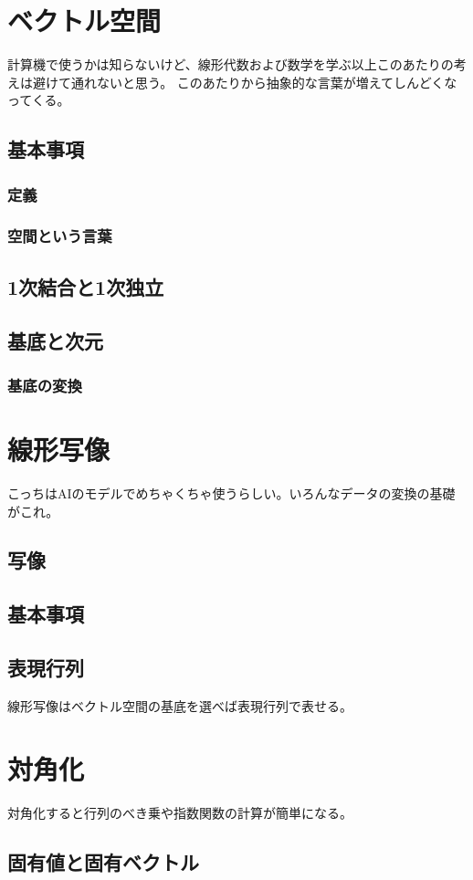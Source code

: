 \documentclass[10pt]{jsarticle}
\theoremstyle{definition}%
\numberwithin{equation}{section}%
\begin{document}
\section{ベクトル空間}
計算機で使うかは知らないけど、線形代数および数学を学ぶ以上このあたりの考えは避けて通れないと思う。
このあたりから抽象的な言葉が増えてしんどくなってくる。
\subsection{基本事項}
\subsubsection{定義}
\subsubsection{空間という言葉}
\subsection{1次結合と1次独立}
\subsection{基底と次元}
\subsubsection{基底の変換}
\section{線形写像}
こっちはAIのモデルでめちゃくちゃ使うらしい。いろんなデータの変換の基礎がこれ。
\subsection{写像}
\subsection{基本事項}
\subsection{表現行列}
線形写像はベクトル空間の基底を選べば表現行列で表せる。
\section{対角化}
対角化すると行列のべき乗や指数関数の計算が簡単になる。
\subsection{固有値と固有ベクトル}
\end{document}
